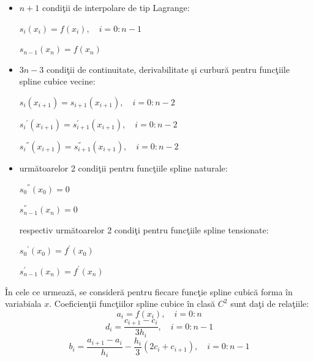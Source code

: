 \documentclass{exam}
\begin{document}
\begin{itemize}
	\item $n+1$ condiţii de interpolare de tip Lagrange:
	      \begin{center}
		      $s_i(x_i) = f(x_i), \quad i = 0:n-1$
	      \end{center}
	      \begin{center}
		      $s_{n-1}(x_n) = f(x_n)$
	      \end{center}

	\item $3n-3$ condiţii de continuitate, derivabilitate şi curbură pentru funcţiile spline cubice vecine:
	      \begin{center}
		      $s_i(x_{i+1}) = s_{i+1}(x_{i+1}), \quad i = 0:n-2$
	      \end{center}
	      \begin{center}
		      ${s_i}^{'}(x_{i+1}) = {s^{'}_{i+1}}(x_{i+1}), \quad i = 0:n-2$
	      \end{center}
	      \begin{center}
		      ${s_i}^{''}(x_{i+1}) = {s^{''}_{i+1}}(x_{i+1}), \quad i = 0:n-2$
	      \end{center}

	\item următoarelor 2 condiţii pentru funcţiile spline naturale:
	      \begin{center}
		      ${s_0}^{''}(x_{0}) = 0$
	      \end{center}
	      \begin{center}
		      ${s^{''}_{n-1}}(x_{n})=0$
	      \end{center}

	      respectiv următoarelor 2 condiţi pentru funcţiile spline tensionate:
	      \begin{center}
		      ${s_0}^{'}(x_{0}) = {f}^{'}(x_{0})$
	      \end{center}
	      \begin{center}
		      ${s^{'}_{n-1}}(x_{n}) = {f}^{'}(x_{n})$
	      \end{center}
\end{itemize}

În cele ce urmează, se consideră pentru fiecare funcţie spline cubică forma în variabiala $x$. Coeficienţii funcţiilor spline cubice în clasă $C^2$ sunt daţi de relaţiile:
$$a_i = f(x_{i}), \quad i = 0:n$$
$$d_i = \frac {c_{i+1}-c_i}{3h_i}, \quad i = 0:n-1$$
$$b_i = \frac {a_{i+1}-a_i}{h_i} - \frac {h_i}{3} (2c_i+c_{i+1}), \quad i = 0:n-1$$
\end{document}
